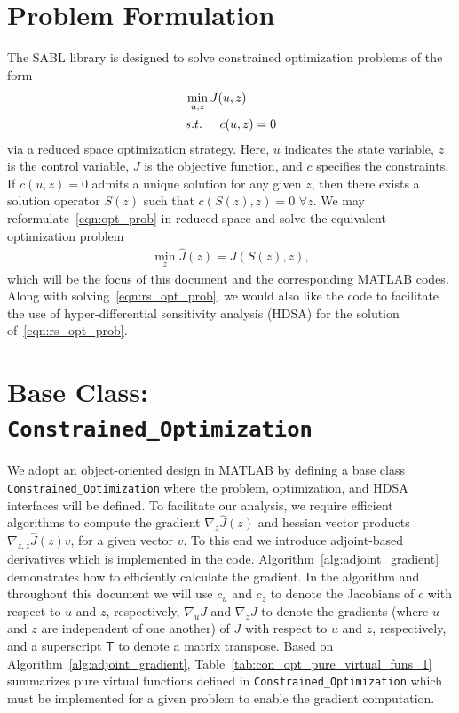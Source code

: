 \documentclass{article}
\begin{document}
\section*{Problem Formulation}

The SABL library is designed to solve constrained optimization problems of the form
\begin{align}
\label{eqn:opt_prob}
& \min_{u ,z } J(u,z) \\
& s.t. \hspace{5 mm} c(u,z) = 0\nonumber
\end{align}
via a reduced space optimization strategy.
Here, $u$ indicates the state variable, $z$ is the control variable, $J$ is the objective function, and $c$ specifies the constraints.
If $c(u,z)=0$ admits a unique solution for any given $z$, then there exists a solution operator $S(z)$ such that $c(S(z),z)=0$ $\forall z$. We may reformulate~\eqref{eqn:opt_prob} in reduced space and solve the equivalent optimization problem
\begin{align}
\label{eqn:rs_opt_prob}
 \min_{z } \hat{J}(z)=J(S(z),z),
\end{align}
which will be the focus of this document and the corresponding MATLAB codes. Along with solving~\eqref{eqn:rs_opt_prob}, we would also like the code to facilitate the use of hyper-differential sensitivity analysis (HDSA) for the solution of~\eqref{eqn:rs_opt_prob}.

\section*{Base Class: \texttt{Constrained\_Optimization} }

We adopt an object-oriented design in MATLAB by defining a base class \texttt{Constrained\_Optimization} where the problem, optimization, and HDSA interfaces will be defined.
To facilitate our analysis, we require efficient algorithms to compute the gradient $\nabla_z \hat{J}(z)$ and hessian vector products $\nabla_{z,z} \hat{J}(z) v$, for a given vector $v$. To this end we introduce adjoint-based derivatives which is implemented in the code. Algorithm~\ref{alg:adjoint_gradient} demonstrates how to efficiently calculate the gradient. In the algorithm and throughout this document we will use $c_u$ and $c_z$ to denote the Jacobians of $c$ with respect to $u$ and $z$, respectively, $\nabla_u J$ and $\nabla_z J$ to denote the gradients (where $u$ and $z$ are independent of one another) of $J$ with respect to $u$ and $z$, respectively, and a superscript $\mathsf{T}$ to denote a matrix transpose. Based on Algorithm~\ref{alg:adjoint_gradient}, Table~\ref{tab:con_opt_pure_virtual_funs_1} summarizes pure virtual functions defined in \texttt{Constrained\_Optimization} which must be implemented for a given problem to enable the gradient computation.
\end{document}
